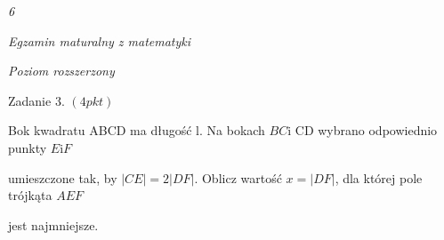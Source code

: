 \documentclass[a4paper,12pt]{article}
\begin{document}
{\it 6}

{\it Egzamin maturalny z matematyki}

{\it Poziom rozszerzony}

Zadanie 3. $(4pkt)$

Bok kwadratu ABCD ma długość l. Na bokach $BC\mathrm{i}$ CD wybrano odpowiednio punkty $E\mathrm{i}F$

umieszczone tak, by $|CE|=2|DF|$. Oblicz wartość $x=|DF|$, dla której pole trójkąta $AEF$

jest najmniejsze.
\end{document}
